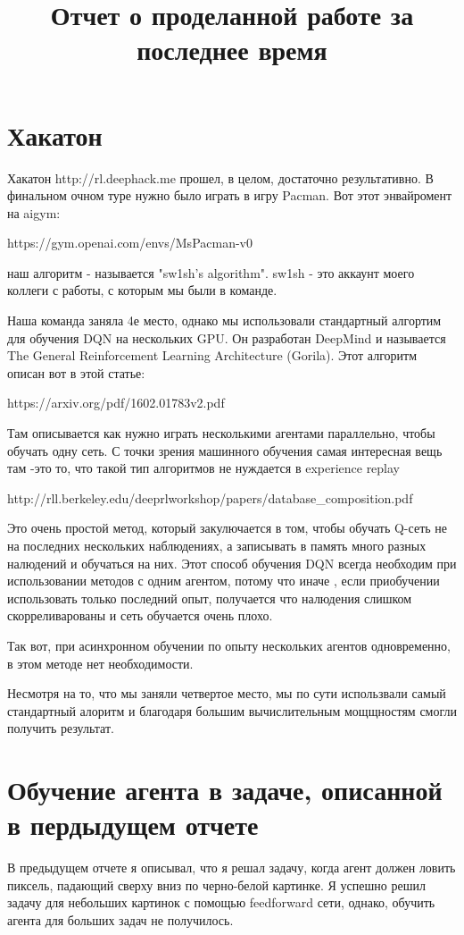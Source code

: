 \documentclass[a4paper]{article}
\begin{document}
\title{Отчет о проделанной работе за последнее время}

\maketitle 

\section{Хакатон}
Хакатон http://rl.deephack.me прошел, в целом, достаточно результативно. В финальном очном туре нужно было играть в игру Pacman. Вот этот энвайромент на aigym:

https://gym.openai.com/envs/MsPacman-v0

наш алгоритм  - называется "sw1sh's algorithm". 
sw1sh - это аккаунт моего коллеги с работы, с которым мы были в команде.


Наша команда заняла 4е место, однако мы использовали стандартный алгортим для обучения DQN на нескольких GPU. Он разработан DeepMind и называется  The General Reinforcement Learning Architecture (Gorila).
Этот алгоритм описан вот в этой статье:

https://arxiv.org/pdf/1602.01783v2.pdf

Там описывается как нужно играть несколькими агентами параллельно, чтобы обучать одну сеть. С точки зрения машинного обучения самая интересная вещь там -это то, что такой тип алгоритмов не нуждается в experience replay


http://rll.berkeley.edu/deeprlworkshop/papers/database\_composition.pdf

Это очень простой метод, который закулючается в том, чтобы обучать Q-сеть не на последних нескольких наблюдениях, а записывать в память много разных налюдений и обучаться на них. Этот способ обучения DQN всегда необходим при использовании методов с одним агентом, потому что иначе , если приобучении использовать только последний опыт, получается что налюдения слишком скорреливарованы и сеть обучается очень плохо. 

Так вот, при асинхронном обучении по опыту нескольких агентов одновременно, в этом методе нет необходимости.

Несмотря на то, что мы заняли четвертое место, мы по сути использвали самый стандартный алоритм и благодаря большим вычислительным мощщностям смогли получить результат.
\section{Обучение агента в задаче, описанной в пердыдущем отчете}
 В предыдущем отчете я описывал, что я решал задачу, когда агент должен ловить пиксель, падающий сверху вниз по черно-белой картинке.
Я успешно решил задачу для небольших картинок с помощью feedforward сети, однако, обучить агента для больших задач не получилось.
\end{document}
